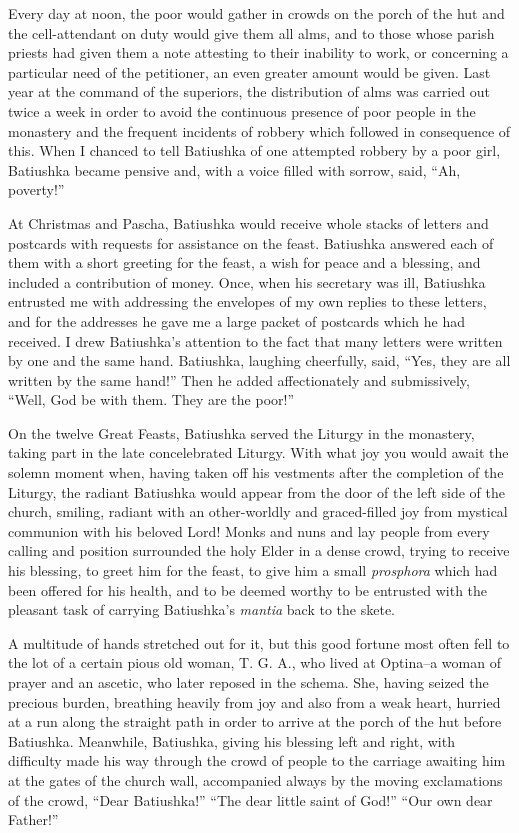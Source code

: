 Every day at noon, the poor would gather in crowds on the porch of the hut and the cell-attendant on duty would give them all alms, and to those whose parish priests had given them a note attesting to their inability to work, or concerning a particular need of the petitioner, an even greater amount would be given. Last year at the command of the superiors, the distribution of alms was carried out twice a week in order to avoid the continuous presence of poor people in the monastery and the frequent incidents of robbery which followed in consequence of this. When I chanced to tell Batiushka of one attempted robbery by a poor girl, Batiushka became pensive and, with a voice filled with sorrow, said, ``Ah, poverty!''

At Christmas and Pascha, Batiushka would receive whole stacks of letters and postcards with requests for assistance on the feast. Batiushka answered each of them with a short greeting for the feast, a wish for peace and a blessing, and included a contribution of money. Once, when his secretary was ill, Batiushka entrusted me with addressing the envelopes of my own replies to these letters, and for the addresses he gave me a large packet of postcards which he had received. I drew Batiushka's attention to the fact that many letters were written by one and the same hand. Batiushka, laughing cheerfully, said, ``Yes, they are all written by the same hand!'' Then he added affectionately and submissively, ``Well, God be with them. They are the poor!''

On the twelve Great Feasts, Batiushka served the Liturgy in the monastery, taking part in the late concelebrated Liturgy. With what joy you would await the solemn moment when, having taken off his vestments after the completion of the Liturgy, the radiant Batiushka would appear from the door of the left side of the church, smiling, radiant with an other-worldly and graced-filled joy from mystical communion with his beloved Lord! Monks and nuns and lay people from every calling and position surrounded the holy Elder in a dense crowd, trying to receive his blessing, to greet him for the feast, to give him a small \textit{prosphora} which had been offered for his health, and to be deemed worthy to be entrusted with the pleasant task of carrying Batiushka's \textit{mantia} back to the skete.

A multitude of hands stretched out for it, but this good fortune most often fell to the lot of a certain pious old woman, T. G. A., who lived at Optina--a woman of prayer and an ascetic, who later reposed in the schema. She, having seized the precious burden, breathing heavily from joy and also from a weak heart, hurried at a run along the straight path in order to arrive at the porch of the hut before Batiushka. Meanwhile, Batiushka, giving his blessing left and right, with difficulty made his way through the crowd of people to the carriage awaiting him at the gates of the church wall, accompanied always by the moving exclamations of the crowd, ``Dear Batiushka!'' ``The dear little saint of God!'' ``Our own dear Father!''

